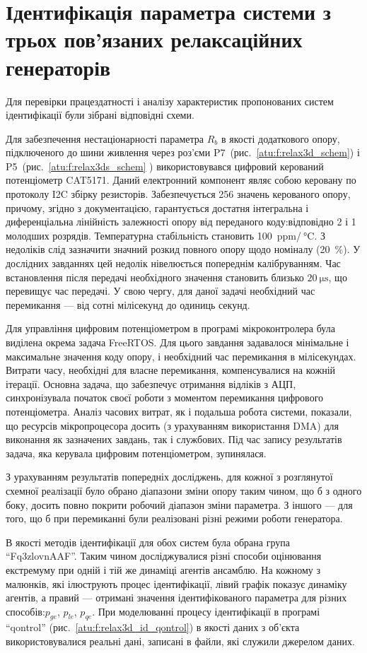 \section{Ідентифікація параметра системи з трьох пов'язаних релаксаційних генераторів}

Для перевірки працездатності і аналізу характеристик
пропонованих систем ідентифікації були зібрані відповідні
схеми.

Для забезпечення нестаціонарності параметра
$R_b$ в якості додаткового опору, підключеного до шини живлення
через роз'єми P7~(рис.~\ref{atu:f:relax3d_schem}) і P5~(рис.~\ref{atu:f:relax3ds_schem} )
використовувався цифровий керований потенціометр CAT5171. Даний
електронний компонент являє собою керовану по протоколу
I2C збірку резисторів. Забезпечується 256 значень керованого
опору, причому, згідно з документацією, гарантується достатня
інтегральна і диференціальна лінійність залежності опору від
переданого коду:відповідно 2 і 1 молодших розрядів. Температурна
стабільність становить 100~ppm/${}\SI{}{\celsius} $.
З недоліків слід зазначити значний розкид повного
опору щодо номіналу (20~\%). У дослідних завданнях цей недолік
нівелюється попереднім калібруванням. Час встановлення після
передачі необхідного значення становить близько
$\SI{20}{\micro \second} $, що перевищує час передачі. У свою чергу, для
даної задачі необхідний час перемикання --- від сотні
мілісекунд до одиниць секунд.

Для управління цифровим потенціометром в програмі
мікроконтролера була виділена окрема задача FreeRTOS. Для цього
завдання задавалося мінімальне і максимальне значення коду
опору, і необхідний час перемикання в мілісекундах. Витрати часу,
необхідні для власне перемикання, компенсувалися на кожній
ітерації. Основна задача, що забезпечує отримання відліків з
АЦП, синхронізувала початок своєї роботи з моментом перемикання
цифрового потенціометра. Аналіз часових витрат, як і подальша
робота системи, показали, що ресурсів мікропроцесора досить
(з урахуванням використання DMA) для виконання як зазначених
завдань, так і службових. Під час запису результатів задача,
яка керувала цифровим потенціометром, зупинялася.

З урахуванням результатів попередніх досліджень, для кожної з
розглянутої схемної реалізації було обрано діапазони зміни
опору таким чином, що б з одного боку, досить повно покрити
робочий діапазон зміни параметра. З іншого --- для того, що б при
перемиканні були реалізовані різні режими роботи генератора.

В якості методів ідентифікації для обох систем була обрана група
``Fq3zlovnAAF''. Таким чином досліджувалися різні способи оцінювання
екстремуму при одній і тій же динаміці агентів ансамблю. На
кожному з малюнків, які ілюструють процес ідентифікації, лівий
графік показує динаміку агентів, а правий --- отримані значення
ідентифікованого параметра для різних способів:$ p_{ge} $,
$p_{le}$,
$p_{qe}$. При моделюванні процесу ідентифікації в програмі ``qontrol''
(рис.~\ref{atu:f:relax3d_id_qontrol}) в якості даних з об'єкта використовувалися
реальні дані, записані в файли, які служили джерелом даних.

